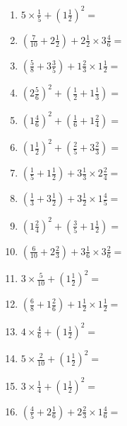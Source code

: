 \documentclass[12pt]{article}
\begin{document}
\begin{enumerate}
\item \large $ 5 \times \frac{1}{5} + (1 \frac{1}{2})^2 = $ \vspace{1.8cm}
\item \large $ (\frac{7}{10} + 2 \frac{1}{2}) + 2 \frac{1}{2} \times 3 \frac{4}{6} = $ \vspace{1.8cm}
\item \large $ (\frac{5}{8} + 3 \frac{3}{5}) + 1 \frac{2}{3} \times 1 \frac{1}{2} = $ \vspace{1.8cm}
\item \large $ (2 \frac{5}{6})^2 + (\frac{1}{2} + 1 \frac{1}{3}) = $ \vspace{1.8cm}
\item \large $ (1 \frac{4}{6})^2 + (\frac{1}{6} + 1 \frac{2}{4}) = $ \vspace{1.8cm}
\item \large $ (1 \frac{1}{2})^2 + (\frac{2}{5} + 3 \frac{2}{3}) = $ \vspace{1.8cm}
\item \large $ (\frac{1}{5} + 1 \frac{1}{2}) + 3 \frac{1}{3} \times 2 \frac{2}{4} = $ \vspace{1.8cm}
\item \large $ (\frac{1}{3} + 3 \frac{1}{2}) + 3 \frac{1}{2} \times 1 \frac{4}{5} = $ \vspace{1.8cm}
\item \large $ (1 \frac{2}{4})^2 + (\frac{3}{5} + 1 \frac{1}{2}) = $ \vspace{1.8cm}
\item \large $ (\frac{6}{10} + 2 \frac{2}{3}) + 3 \frac{1}{6} \times 3 \frac{2}{6} = $ \vspace{1.8cm}
\newpage
\item \large $ 3 \times \frac{5}{10} + (1 \frac{1}{2})^2 = $ \vspace{1.8cm}
\item \large $ (\frac{6}{8} + 1 \frac{2}{6}) + 1 \frac{1}{2} \times 1 \frac{1}{2} = $ \vspace{1.8cm}
\item \large $ 4 \times \frac{4}{6} + (1 \frac{1}{2})^2 = $ \vspace{1.8cm}
\item \large $ 5 \times \frac{2}{10} + (1 \frac{1}{2})^2 = $ \vspace{1.8cm}
\item \large $ 3 \times \frac{1}{4} + (1 \frac{1}{2})^2 = $ \vspace{1.8cm}
\item \large $ (\frac{4}{5} + 2 \frac{1}{6}) + 2 \frac{2}{3} \times 1 \frac{4}{6} = $ \vspace{1.8cm}

\end{enumerate}
\end{document}
